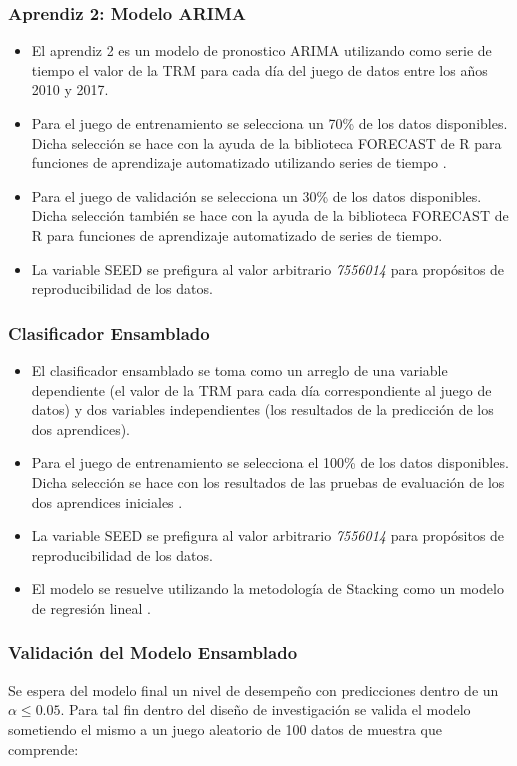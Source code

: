 \subsubsection{Aprendiz 2: Modelo ARIMA}
\begin{itemize}
	\item El aprendiz 2 es un modelo de pronostico ARIMA utilizando como serie de tiempo el valor de la TRM para cada día del juego de datos entre los años 2010 y 2017.
	\item Para el juego de entrenamiento se selecciona un 70\% de los datos disponibles. Dicha selección se hace con la ayuda de la biblioteca FORECAST de R para funciones de aprendizaje automatizado utilizando series de tiempo \cite{hyndman}. 
	\item Para el juego de validación se selecciona un 30\% de los datos disponibles. Dicha selección también se hace con la ayuda de la biblioteca FORECAST de R para funciones de aprendizaje automatizado de series de tiempo. 
	\item La variable SEED se prefigura al valor arbitrario \emph{7556014} para propósitos de reproducibilidad de los datos. 
\end{itemize}

\subsubsection{Clasificador Ensamblado}
\begin{itemize}
	\item El clasificador ensamblado se toma como un arreglo de una variable dependiente (el valor de la TRM para cada día correspondiente al juego de datos) y dos variables independientes (los resultados de la predicción de los dos aprendices). 
	\item Para el juego de entrenamiento se selecciona el 100\% de los datos disponibles. Dicha selección se hace con los resultados de las pruebas de evaluación de los dos aprendices iniciales \cite{popularEnsemble}.
	\item La variable SEED se prefigura al valor arbitrario \emph{7556014} para propósitos de reproducibilidad de los datos. 
	\item El modelo se resuelve utilizando la metodología de Stacking como un modelo de regresión lineal \cite{smolyakov}.
\end{itemize}

\subsubsection{Validación del Modelo Ensamblado}
Se espera del modelo final un nivel de desempeño con predicciones dentro de un \(\alpha \leq 0.05\). Para tal fin dentro del diseño de investigación se valida el modelo sometiendo el mismo a un juego aleatorio de 100 datos de muestra que comprende:

